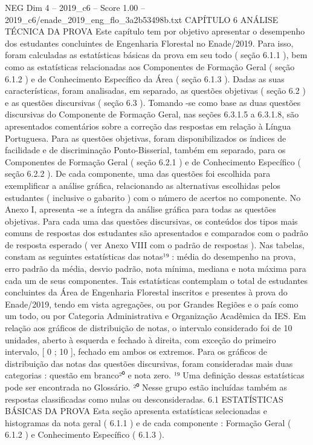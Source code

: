 \begin{textsample}{NEG Dim 4 – 2019\_c6 – Score 1.00 – 2019\_c6/enade\_2019\_eng\_flo\_3a2b53498b.txt}  \label{ex:f4_neg_262}
CAPÍTULO 6 ANÁLISE TÉCNICA DA PROVA Este capítulo tem por objetivo apresentar o desempenho dos estudantes concluintes de Engenharia Florestal no Enade/2019.
Para isso, foram calculadas as estatísticas básicas da prova em seu todo ( seção 6.1.1 ), bem como as estatísticas relacionadas aos Componentes de Formação Geral ( seção 6.1.2 ) e de Conhecimento Específico da Área ( seção 6.1.3 ).
Dadas as suas características, foram analisadas, em separado, as questões objetivas ( seção 6.2 ) e as questões discursivas ( seção 6.3 ).
Tomando -se como base as duas questões discursivas do Componente de Formação Geral, nas seções 6.3.1.5 a 6.3.1.8, são apresentados comentários sobre a correção das respostas em relação à Língua Portuguesa.
Para as questões objetivas, foram disponibilizados os índices de facilidade e de discriminação Ponto-Bisserial, também em separado, para os Componentes de Formação Geral ( seção 6.2.1 ) e de Conhecimento Específico ( seção 6.2.2 ).
De cada componente, uma das questões foi escolhida para exemplificar a análise gráfica, relacionando as alternativas escolhidas pelos estudantes ( inclusive o gabarito ) com o número de acertos no componente.
No Anexo I, apresenta -se a íntegra da análise gráfica para todas as questões objetivas.
Para cada uma das questões discursivas, os conteúdos dos tipos mais comuns de respostas dos estudantes são apresentados e comparados com o padrão de resposta esperado ( ver Anexo VIII com o padrão de respostas ).
Nas tabelas, constam as seguintes estatísticas das notas¹⁹ : média do desempenho na prova, erro padrão da média, desvio padrão, nota mínima, mediana e nota máxima para cada um de seus componentes.
Tais estatísticas contemplam o total de estudantes concluintes da Área de Engenharia Florestal inscritos e presentes à prova do Enade/2019, tendo em vista agregações, ou por Grandes Regiões e o país como um todo, ou por Categoria Administrativa e Organização Acadêmica da IES.
Em relação aos gráficos de distribuição de notas, o intervalo considerado foi de 10 unidades, aberto à esquerda e fechado à direita, com exceção do primeiro intervalo, [ 0 ; 10 ], fechado em ambos os extremos.
Para os gráficos de distribuição das notas das questões discursivas, foram consideradas mais duas categorias : questão em branco²⁰ e nota zero. ¹⁹ Uma definição dessas estatísticas pode ser encontrada no Glossário. ²⁰ Nesse grupo estão incluídas também as respostas classificadas como nulas ou desconsideradas. 6.1 ESTATÍSTICAS BÁSICAS DA PROVA Esta seção apresenta estatísticas selecionadas e histogramas da nota geral ( 6.1.1 ) e de cada componente : Formação Geral ( 6.1.2 ) e Conhecimento Específico ( 6.1.3 ).

\end{textsample}
